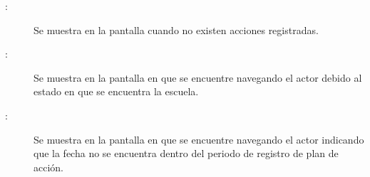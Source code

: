 	
\begin{description}
	\item[:] Se muestra en la pantalla  cuando no existen acciones registradas.
	\item[:] Se muestra en la pantalla en que se encuentre navegando el actor debido al estado en que se encuentra la escuela.	
	\item[\UCli {}:] Se muestra en la pantalla en que se encuentre navegando el actor indicando que la fecha no se encuentra dentro del periodo de registro de plan de acción.	
\end{description}
